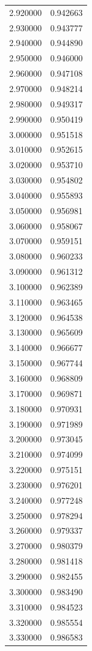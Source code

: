 \begin{tabular}{rr}
2.920000 & 0.942663 \\
2.930000 & 0.943777 \\
2.940000 & 0.944890 \\
2.950000 & 0.946000 \\
2.960000 & 0.947108 \\
2.970000 & 0.948214 \\
2.980000 & 0.949317 \\
2.990000 & 0.950419 \\
3.000000 & 0.951518 \\
3.010000 & 0.952615 \\
3.020000 & 0.953710 \\
3.030000 & 0.954802 \\
3.040000 & 0.955893 \\
3.050000 & 0.956981 \\
3.060000 & 0.958067 \\
3.070000 & 0.959151 \\
3.080000 & 0.960233 \\
3.090000 & 0.961312 \\
3.100000 & 0.962389 \\
3.110000 & 0.963465 \\
3.120000 & 0.964538 \\
3.130000 & 0.965609 \\
3.140000 & 0.966677 \\
3.150000 & 0.967744 \\
3.160000 & 0.968809 \\
3.170000 & 0.969871 \\
3.180000 & 0.970931 \\
3.190000 & 0.971989 \\
3.200000 & 0.973045 \\
3.210000 & 0.974099 \\
3.220000 & 0.975151 \\
3.230000 & 0.976201 \\
3.240000 & 0.977248 \\
3.250000 & 0.978294 \\
3.260000 & 0.979337 \\
3.270000 & 0.980379 \\
3.280000 & 0.981418 \\
3.290000 & 0.982455 \\
3.300000 & 0.983490 \\
3.310000 & 0.984523 \\
3.320000 & 0.985554 \\
3.330000 & 0.986583 \\

\end{tabular}
